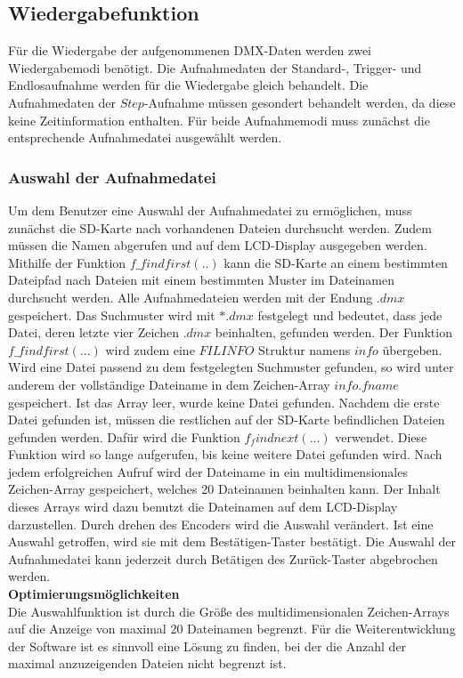 
\subsection{Wiedergabefunktion}
Für die Wiedergabe der aufgenommenen DMX-Daten werden zwei Wiedergabemodi benötigt. Die Aufnahmedaten der Standard-, Trigger- und Endlosaufnahme werden für die Wiedergabe gleich behandelt. Die Aufnahmedaten der $Step$-Aufnahme müssen gesondert behandelt werden, da diese keine Zeitinformation enthalten. Für beide Aufnahmemodi muss zunächst die entsprechende Aufnahmedatei ausgewählt werden.

\subsubsection{Auswahl der Aufnahmedatei}
\label{sec:selectfile}
Um dem Benutzer eine Auswahl der Aufnahmedatei zu ermöglichen, muss zunächst die SD-Karte nach vorhandenen Dateien durchsucht werden. Zudem müssen die Namen abgerufen und auf dem LCD-Display ausgegeben werden. Mithilfe der Funktion $f\_findfirst(..)$ kann die SD-Karte an einem bestimmten Dateipfad nach Dateien mit einem bestimmten Muster im Dateinamen durchsucht werden. Alle Aufnahmedateien werden mit der Endung $.dmx$ gespeichert. Das Suchmuster wird mit $*.dmx$ festgelegt und bedeutet, dass jede Datei, deren letzte vier Zeichen $.dmx$ beinhalten, gefunden werden. Der Funktion $f\_findfirst(...)$ wird zudem eine $FILINFO$ Struktur namens $info$ übergeben. Wird eine Datei passend zu dem festgelegten Suchmuster gefunden, so wird unter anderem der vollständige Dateiname in dem Zeichen-Array $info.fname$ gespeichert. Ist das Array leer, wurde keine Datei gefunden. Nachdem die erste Datei gefunden ist, müssen die restlichen auf der SD-Karte befindlichen Dateien gefunden werden. Dafür wird die Funktion $f_findnext(...)$ verwendet. Diese Funktion wird so lange aufgerufen, bis keine weitere Datei gefunden wird. Nach jedem erfolgreichen Aufruf wird der Dateiname in ein multidimensionales Zeichen-Array gespeichert, welches 20 Dateinamen beinhalten kann. Der Inhalt dieses Arrays wird dazu benutzt die Dateinamen auf dem LCD-Display darzustellen. Durch drehen des Encoders wird die Auswahl verändert. Ist eine Auswahl getroffen, wird sie mit dem Bestätigen-Taster bestätigt. Die Auswahl der Aufnahmedatei kann jederzeit durch Betätigen des Zurück-Taster abgebrochen werden.\\
\newline
\textbf{Optimierungsmöglichkeiten}\\
Die Auswahlfunktion ist durch die Größe des multidimensionalen Zeichen-Arrays auf die Anzeige von maximal 20 Dateinamen begrenzt. Für die Weiterentwicklung der Software ist es sinnvoll eine Lösung zu finden, bei der die Anzahl der maximal anzuzeigenden Dateien nicht begrenzt ist.

